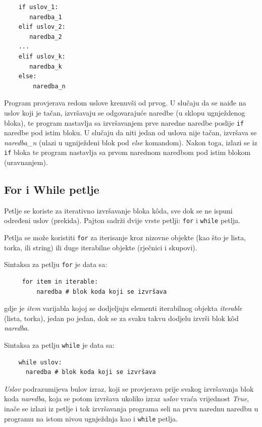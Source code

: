  \begin{verbatim}
 	if uslov_1:
 	   naredba_1
 	elif uslov_2:
 	   naredba_2
 	...
 	elif uslov_k:
 	   naredba_k
 	else:
 	    naredba_n
 \end{verbatim}

Program provjerava redom uslove krenuvši od prvog. U slučaju da se naiđe na  uslov koji je tačan, izvršavaju se odgovarajuće naredbe (u sklopu ugnježdenog  bloka), te program  nastavlja sa izvršavanjem prve naredne naredbe poslije \texttt{if} naredbe pod istim bloku. U slučaju da niti jedan od uslova nije tačan, izvršava se \emph{naredba\_n} (ulazi u ugniježdeni blok pod \textit{else} komandom). Nakon toga, izlazi se iz \texttt{if} bloka te program nastavlja sa prvom narednom naredbom pod istim blokom (uravnanjem).  

\subsection{For i While petlje }

Petlje se koriste za iterativno izvršavanje bloka k\^oda, sve dok se ne ispuni određeni uslov (prekida). Pajton sadrži dvije vrste petlji: \texttt{for} i \texttt{while} petlja.

Petlja se može koristiti \texttt{for} za iterisanje kroz nizovne objekte (kao što je lista, torka, ili string) ili duge iterabilne objekte (rječnici i skupovi).

Sintaksa za petlju \texttt{for} je data sa:
\begin{verbatim}
     for item in iterable:
         naredba # blok koda koji se izvršava
\end{verbatim}
gdje je \emph{item} varijabla kojoj se dodjeljuju elementi iterabilnog objekta \textit{iterable} (lista, torka), jedan po jedan, dok se za svaku takvu dodjelu izvrši blok k\^od \emph{naredba}. 
 
Sintaksa za petlju \texttt{while} je data sa:

\begin{verbatim}
    while uslov:
	  naredba # blok koda koji se izvršava
\end{verbatim}
\emph{Uslov} podrazumijeva bulov izraz, koji se provjerava prije svakog izvršavanja blok koda \emph{naredba}, koja se potom izvršava ukoliko izraz \emph{uslov} vraća vrijednost  \emph{True}, inače se izlazi iz petlje i tok izvršavanja programa seli na prvu narednu naredbu u programu na istom nivou ugnježdnja kao i \texttt{while} petlja. 

